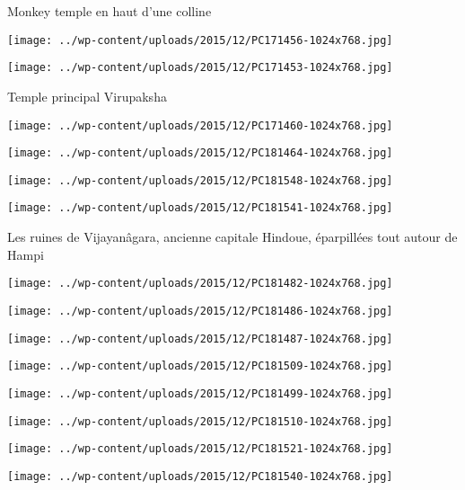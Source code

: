 Monkey temple en haut d'une colline 
\begin{center} \texttt{[image: ../wp-content/uploads/2015/12/PC171456-1024x768.jpg]} \end{center}
\begin{center} \texttt{[image: ../wp-content/uploads/2015/12/PC171453-1024x768.jpg]} \end{center}

Temple principal Virupaksha 
\begin{center} \texttt{[image: ../wp-content/uploads/2015/12/PC171460-1024x768.jpg]} \end{center}
\begin{center} \texttt{[image: ../wp-content/uploads/2015/12/PC181464-1024x768.jpg]} \end{center}
\begin{center} \texttt{[image: ../wp-content/uploads/2015/12/PC181548-1024x768.jpg]} \end{center}
\begin{center} \texttt{[image: ../wp-content/uploads/2015/12/PC181541-1024x768.jpg]} \end{center}

Les ruines de Vijayanâgara, ancienne capitale Hindoue, éparpillées tout autour de Hampi 
\begin{center} \texttt{[image: ../wp-content/uploads/2015/12/PC181482-1024x768.jpg]} \end{center}
\begin{center} \texttt{[image: ../wp-content/uploads/2015/12/PC181486-1024x768.jpg]} \end{center}
\begin{center} \texttt{[image: ../wp-content/uploads/2015/12/PC181487-1024x768.jpg]} \end{center}
\begin{center} \texttt{[image: ../wp-content/uploads/2015/12/PC181509-1024x768.jpg]} \end{center}
\begin{center} \texttt{[image: ../wp-content/uploads/2015/12/PC181499-1024x768.jpg]} \end{center}
\begin{center} \texttt{[image: ../wp-content/uploads/2015/12/PC181510-1024x768.jpg]} \end{center}
\begin{center} \texttt{[image: ../wp-content/uploads/2015/12/PC181521-1024x768.jpg]} \end{center}
\begin{center} \texttt{[image: ../wp-content/uploads/2015/12/PC181540-1024x768.jpg]} \end{center}

